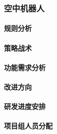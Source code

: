 \subsubsection{空中机器人}

    \paragraph{规则分析}
    
    \paragraph{策略战术}
    
    \paragraph{功能需求分析}
    
    \paragraph{改进方向}

    \paragraph{研发进度安排}

    \paragraph{项目组人员分配}
    